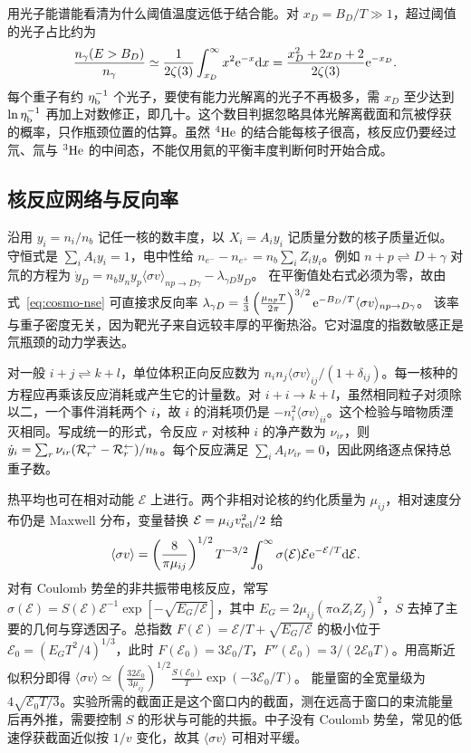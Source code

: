 用光子能谱能看清为什么阈值温度远低于结合能。对 $x_D=B_D/T\gg1$，超过阈值的光子占比约为
\[
 \frac{n_\gamma(E>B_D)}{n_\gamma}
 \simeq\frac{1}{2\zeta(3)}\int_{x_D}^{\infty}x^2\mathrm{e}^{-x}\dd x
 =\frac{x_D^2+2x_D+2}{2\zeta(3)}\mathrm{e}^{-x_D}.
\]
每个重子有约 $\eta_{\rm b}^{-1}$ 个光子，要使有能力光解离的光子不再极多，需 $x_D$ 至少达到 $\ln\eta_{\rm b}^{-1}$ 再加上对数修正，即几十。这个数目判据忽略具体光解离截面和氘被俘获的概率，只作瓶颈位置的估算。虽然 $^4{\rm He}$ 的结合能每核子很高，核反应仍要经过氘、氚与 $^3{\rm He}$ 的中间态，不能仅用氦的平衡丰度判断何时开始合成。

\subsection{核反应网络与反向率}

沿用 $y_i=n_i/n_b$ 记任一核的数丰度，以 $X_i=A_i y_i$ 记质量分数的核子质量近似。守恒式是 $\sum_iA_i y_i=1$，电中性给 $n_{e^-}-n_{e^+}=n_b\sum_iZ_i y_i$。例如 $n+p\rightleftharpoons D+\gamma$ 对氘的方程为 $\dot y_D=n_b y_n y_p\langle\sigma v\rangle_{np\to D\gamma} -\lambda_{\gamma D}y_D$。
在平衡值处右式必须为零，故由式~\eqref{eq:cosmo-nse} 可直接求反向率 $\lambda_{\gamma D}=\allowbreak{}\frac43\left(\frac{\mu_{np}T}{2\pi}\right)^{3/2} \mathrm{e}^{-B_D/T}\langle\sigma v\rangle_{np\to D\gamma}$。
该率与重子密度无关，因为靶光子来自远较丰厚的平衡热浴。它对温度的指数敏感正是氘瓶颈的动力学表达。

对一般 $i+j\rightleftharpoons k+l$，单位体积正向反应数为 $n_i n_j\langle\sigma v\rangle_{ij}/(1+\delta_{ij})$。每一核种的方程应再乘该反应消耗或产生它的计量数。对 $i+i\to k+l$，虽然相同粒子对须除以二，一个事件消耗两个 $i$，故 $i$ 的消耗项仍是 $-n_i^2\langle\sigma v\rangle_{ii}$。这个检验与暗物质湮灭相同。写成统一的形式，令反应 $r$ 对核种 $i$ 的净产数为 $\nu_{ir}$，则 $\dot y_i=\sum_r\nu_{ir}({\cal R}_r^{\to}-{\cal R}_r^{\leftarrow})/n_b$。每个反应满足 $\sum_i A_i\nu_{ir}=0$，因此网络逐点保持总重子数。

热平均也可在相对动能 $\mathcal E$ 上进行。两个非相对论核的约化质量为 $\mu_{ij}$，相对速度分布仍是 Maxwell 分布，变量替换 $\mathcal E=\mu_{ij}v_{\rm rel}^2/2$ 给
\[
 \langle\sigma v\rangle=
 \left(\frac{8}{\pi\mu_{ij}}\right)^{1/2}T^{-3/2}
 \int_0^\infty \sigma(\mathcal E)\mathcal E\mathrm{e}^{-\mathcal E/T}\dd\mathcal E .
\]
对有 Coulomb 势垒的非共振带电核反应，常写 $\sigma(\mathcal E)=S(\mathcal E)\mathcal E^{-1}\exp[-\sqrt{E_G/\mathcal E}]$，其中 $E_G=2\mu_{ij}(\pi\alpha Z_iZ_j)^2$，$S$ 去掉了主要的几何与穿透因子。总指数 $F(\mathcal E)=\mathcal E/T+\sqrt{E_G/\mathcal E}$ 的极小位于 $\mathcal E_0=(E_G T^2/4)^{1/3}$，此时 $F(\mathcal E_0)=3\mathcal E_0/T$，$F''(\mathcal E_0)=3/(2\mathcal E_0 T)$。用高斯近似积分即得 $\langle\sigma v\rangle\simeq \left(\frac{32\mathcal E_0}{3\mu_{ij}}\right)^{1/2} \frac{S(\mathcal E_0)}{T}\exp(-3\mathcal E_0/T)$。
能量窗的全宽量级为 $4\sqrt{\mathcal E_0T/3}$。实验所需的截面正是这个窗口内的截面，测在远高于窗口的束流能量后再外推，需要控制 $S$ 的形状与可能的共振。中子没有 Coulomb 势垒，常见的低速俘获截面近似按 $1/v$ 变化，故其 $\langle\sigma v\rangle$ 可相对平缓。


